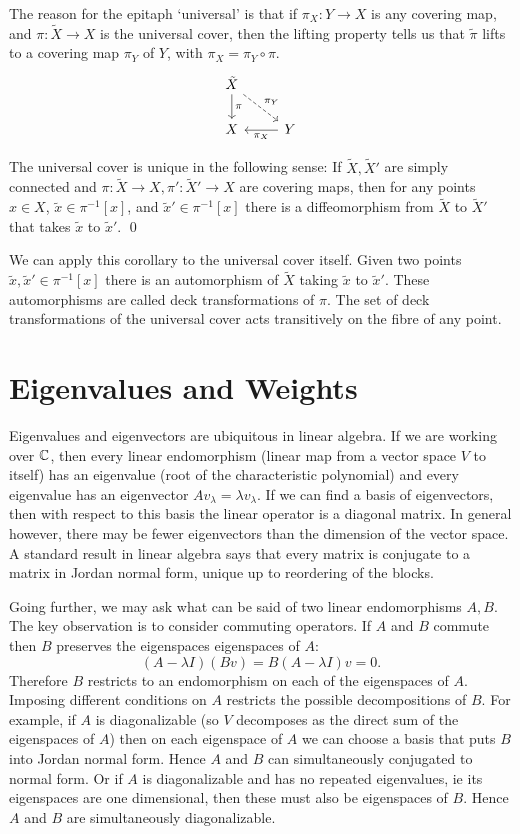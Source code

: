 The reason for the epitaph `universal' is that if $\pi_X : Y \to X$ is any covering map, and $\pi : \tilde{X} \to X$ is the universal cover, then the lifting property tells us that $\tilde{\pi}$ lifts to a covering map $\pi_Y$ of $Y$, with $\pi_X = \pi_Y \circ \pi$.
\[\begin{tikzcd}
\tilde{X} \arrow{d}{\pi} \arrow[dashed]{rd}{\pi_Y} & \\
X & Y \arrow{l}{\pi_X}
\end{tikzcd}\]



\begin{corollary}
The universal cover is unique in the following sense:
If $\tilde{X},\tilde{X}'$ are simply connected and $\pi : \tilde{X} \to X, \pi': \tilde{X}'\to X$ are covering maps, then for any points $x \in X$, $\tilde{x} \in \pi^{-1}[x]$, and $\tilde{x}' \in \pi^{-1}[x]$ there is a diffeomorphism from $\tilde{X}$ to $\tilde{X}'$ that takes $\tilde{x}$ to $\tilde{x}'$.
\qed
\end{corollary}

We can apply this corollary to the universal cover itself.
Given two points $\tilde{x},\tilde{x}' \in \pi^{-1}[x]$ there is an automorphism of $\tilde{X}$ taking $\tilde{x}$ to $\tilde{x}'$.
These automorphisms are called deck transformations of $\pi$.
The set of deck transformations of the universal cover acts transitively on the fibre of any point.



\section{Eigenvalues and Weights}

Eigenvalues and eigenvectors are ubiquitous in linear algebra.
If we are working over $\mathbb{C}$, then every linear endomorphism (linear map from a vector space $V$ to itself) has an eigenvalue (root of the characteristic polynomial) and every eigenvalue has an eigenvector $Av_\lambda = \lambda v_\lambda$.
If we can find a basis of eigenvectors, then with respect to this basis the linear operator is a diagonal matrix.
In general however, there may be fewer eigenvectors than the dimension of the vector space.
A standard result in linear algebra says that every matrix is conjugate to a matrix in Jordan normal form, unique up to reordering of the blocks.

Going further, we may ask what can be said of two linear endomorphisms $A,B$.
The key observation is to consider commuting operators.
If $A$ and $B$ commute then $B$ preserves the eigenspaces  eigenspaces of $A$:
\[
(A- \lambda I) (Bv) 
= B(A- \lambda I) v
= 0.
\]
Therefore $B$ restricts to an endomorphism on each of the eigenspaces of $A$.
Imposing different conditions on $A$ restricts the possible decompositions of $B$.
For example, if $A$ is diagonalizable (so $V$ decomposes as the direct sum of the eigenspaces of $A$) then on each eigenspace of $A$ we can choose a basis that puts $B$ into Jordan normal form.
Hence $A$ and $B$ can simultaneously conjugated to normal form.
Or if $A$ is diagonalizable and has no repeated eigenvalues, ie its eigenspaces are one dimensional, then these must also be eigenspaces of $B$.
Hence $A$ and $B$ are simultaneously diagonalizable.

